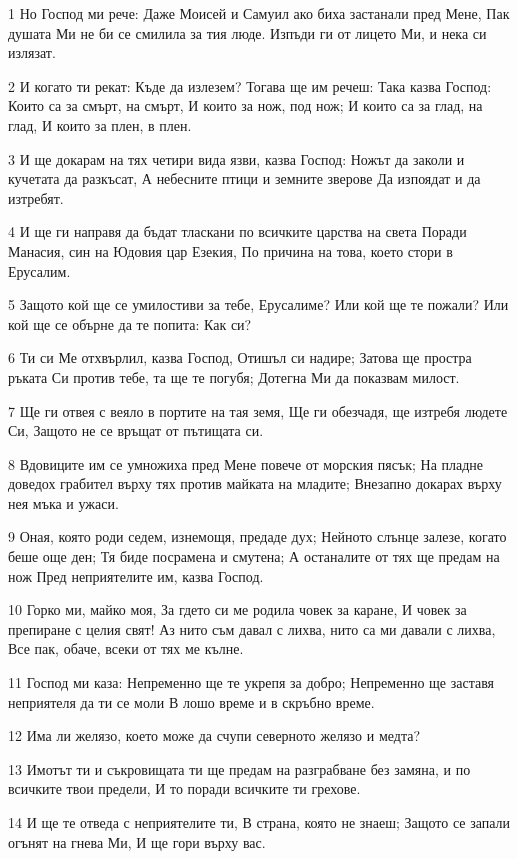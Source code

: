 \par 1 Но Господ ми рече: Даже Моисей и Самуил ако биха застанали пред Мене, Пак душата Ми не би се смилила за тия люде. Изпъди ги от лицето Ми, и нека си излязат.
\par 2 И когато ти рекат: Къде да излезем? Тогава ще им речеш: Така казва Господ: Които са за смърт, на смърт, И които за нож, под нож; И които са за глад, на глад, И които за плен, в плен.
\par 3 И ще докарам на тях четири вида язви, казва Господ: Ножът да заколи и кучетата да разкъсат, А небесните птици и земните зверове Да изпоядат и да изтребят.
\par 4 И ще ги направя да бъдат тласкани по всичките царства на света Поради Манасия, син на Юдовия цар Езекия, По причина на това, което стори в Ерусалим.
\par 5 Защото кой ще се умилостиви за тебе, Ерусалиме? Или кой ще те пожали? Или кой ще се обърне да те попита: Как си?
\par 6 Ти си Ме отхвърлил, казва Господ, Отишъл си надире; Затова ще простра ръката Си против тебе, та ще те погубя; Дотегна Ми да показвам милост.
\par 7 Ще ги отвея с веяло в портите на тая земя, Ще ги обезчадя, ще изтребя людете Си, Защото не се връщат от пътищата си.
\par 8 Вдовиците им се умножиха пред Мене повече от морския пясък; На пладне доведох грабител върху тях против майката на младите; Внезапно докарах върху нея мъка и ужаси.
\par 9 Оная, която роди седем, изнемощя, предаде дух; Нейното слънце залезе, когато беше още ден; Тя биде посрамена и смутена; А останалите от тях ще предам на нож Пред неприятелите им, казва Господ.
\par 10 Горко ми, майко моя, За гдето си ме родила човек за каране, И човек за препиране с целия свят! Аз нито съм давал с лихва, нито са ми давали с лихва, Все пак, обаче, всеки от тях ме кълне.
\par 11 Господ ми каза: Непременно ще те укрепя за добро; Непременно ще заставя неприятеля да ти се моли В лошо време и в скръбно време.
\par 12 Има ли желязо, което може да счупи северното желязо и медта?
\par 13 Имотът ти и съкровищата ти ще предам на разграбване без замяна, и по всичките твои предели, И то поради всичките ти грехове.
\par 14 И ще те отведа с неприятелите ти, В страна, която не знаеш; Защото се запали огънят на гнева Ми, И ще гори върху вас.
